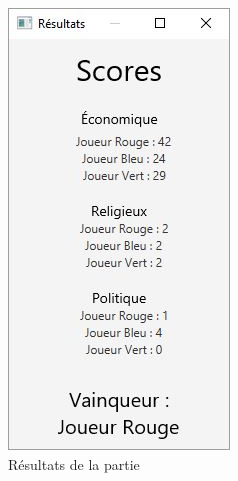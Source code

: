 \begin{figure}[h]
	\centering
	\includegraphics[width=0.3\linewidth]{images/resultats}
	\caption{Résultats de la partie}
	\label{fig:resultats}
\end{figure}

